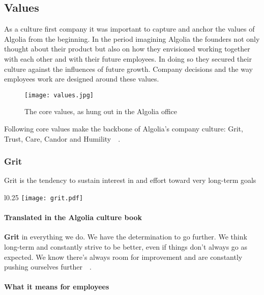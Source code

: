 \subsection{Values}
\label{sub:values}

As a culture first company it was important to capture and anchor the values of Algolia from the beginning. In the period imagining Algolia the founders not only thought about their product but also on how they envisioned working together with each other and with their future employees. In doing so they secured their culture against the influences of future growth. Company decisions and the way employees work are designed around these values.

\begin{figure}[H]
  \centering
  \texttt{[image: values.jpg]}
  \caption{The core values, as hung out in the Algolia office\cite{culture-first}}
  \label{figure:values}
\end{figure}

Following core values make the backbone of Algolia's company culture: Grit, Trust, Care, Candor and Humility~\cite{algolia-values}~. 

\subsubsection{Grit}
\label{ssub:grit}

\begin{definition}
Grit is the tendency to sustain interest in and effort toward very long-term goals\cite{grit-ducks}
\end{definition}

\begin{wrapfigure}{l}{0.25\textwidth}
  \centering
  \texttt{[image: grit.pdf]}
\end{wrapfigure}

\paragraph{Translated in the Algolia culture book}

\textbf{Grit} in everything we do. We have the determination to go further. We think long-term and constantly strive to be better, even if things don’t always go as expected. We know there's always room for improvement and are constantly pushing ourselves further~\cite{algolia-careers}~.

\paragraph{What it means for employees} 

